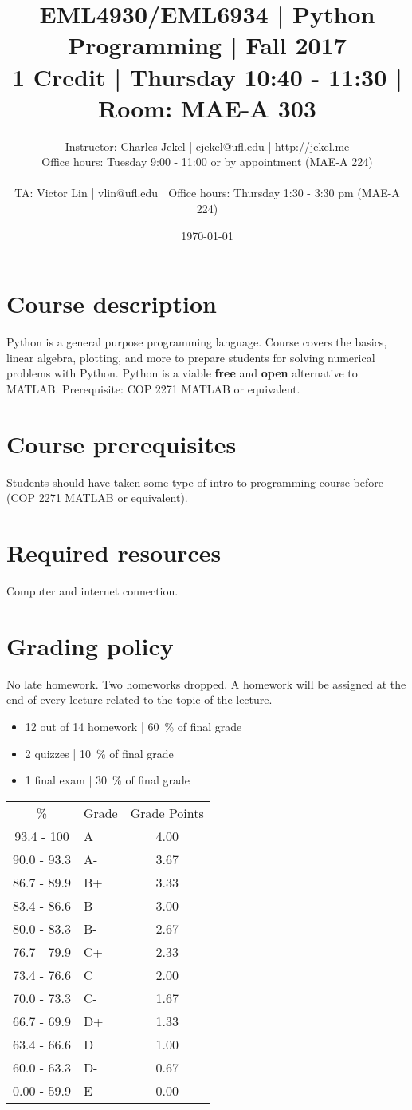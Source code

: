 \documentclass{article}
\title{EML4930/EML6934 | Python Programming | Fall 2017 \\ 1 Credit | Thursday 10:40 - 11:30 |  Room: MAE-A 303}
\author{Instructor: Charles Jekel  |  cjekel@ufl.edu  |  \url{http://jekel.me} \\
 Office hours: Tuesday 9:00 - 11:00 or by appointment (MAE-A 224) \\ \\
 TA: Victor Lin | vlin@ufl.edu | Office hours: Thursday 1:30 - 3:30 pm (MAE-A 224) %
}
\date{\today}
\begin{document}
\maketitle

\section{Course description}
Python is a general purpose programming language. Course covers the basics, linear algebra, plotting, and more to prepare students for solving numerical problems with Python. Python is a viable \textbf{free} and \textbf{open} alternative to MATLAB. Prerequisite: COP 2271 MATLAB or equivalent.

\section{Course prerequisites}
Students should have taken some type of intro to programming course before (COP 2271 MATLAB or equivalent). 

\section{Required resources}
Computer and internet connection.

\section{Grading policy}
No late homework. Two homeworks dropped. A homework will be assigned at the end of every lecture related to the topic of the lecture.
\begin{itemize}
\item 12 out of 14 homework | 60~\% of final grade
\item 2 quizzes | 10~\% of final grade
\item 1 final exam | 30~\% of final grade
\end{itemize}

\begin{table}[h!]
\centering
\begin{tabular}{ c l c } 
\noalign{\smallskip}
 \% & Grade & Grade Points\\
\noalign{\smallskip}\hline\noalign{\smallskip}
93.4 - 100  & A  & 4.00 \\ 
90.0 - 93.3 & A- & 3.67 \\ 
86.7 - 89.9 & B+ & 3.33 \\
83.4 - 86.6 & B  & 3.00 \\ 
80.0 - 83.3 & B- & 2.67 \\ 
76.7 - 79.9 & C+ & 2.33 \\ 
73.4 - 76.6 & C  & 2.00 \\ 
70.0 - 73.3 & C- & 1.67 \\ 
66.7 - 69.9 & D+ & 1.33 \\ 
63.4 - 66.6 & D  & 1.00 \\ 
60.0 - 63.3 & D- & 0.67 \\ 
0.00 - 59.9 & E  & 0.00 \\
 \hline
\end{tabular}
\end{table}
\end{document}
